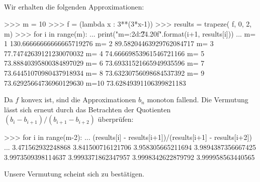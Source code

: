\subsection{}

Wir erhalten die folgenden Approximationen:

\begin{consoleoutput}
>>> m = 10
>>> f = (lambda x : 3**(3*x-1))
>>> results = trapeze( f, 0, 2, m)
>>> for i in range(m):
...     print("m={:2d}\t{:24.20f}".format(i+1, results[i]))
... 
m= 1    130.66666666666665719276
m= 2     89.58204463929762084717
m= 3     77.74742639121230070032
m= 4     74.66669853961546721166
m= 5     73.88840395800384897029
m= 6     73.69331521665949935596
m= 7     73.64451070980437918934
m= 8     73.63230756098684537392
m= 9     73.62925664736960129630
m=10     73.62849391106399821183
\end{consoleoutput}

Da $f$ konvex ist, sind die Approximationen $b_n$ monoton fallend.
Die Vermutung lässt sich erneut durch das Betrachten der Quotienten $(b_i - b_{i+1})/(b_{i+1} - b_{i+2})$ überprüfen:

\begin{consoleoutput}
>>> for i in range(m-2):
...     (results[i] - results[i+1])/(results[i+1] - results[i+2])
... 
3.471562932248868
3.841500716121706
3.958305665211694
3.9894387356667425
3.9973509398114637
3.9993371862347957
3.9998342622879792
3.999958563440565
\end{consoleoutput}

Unsere Vermutung scheint sich zu bestätigen.
